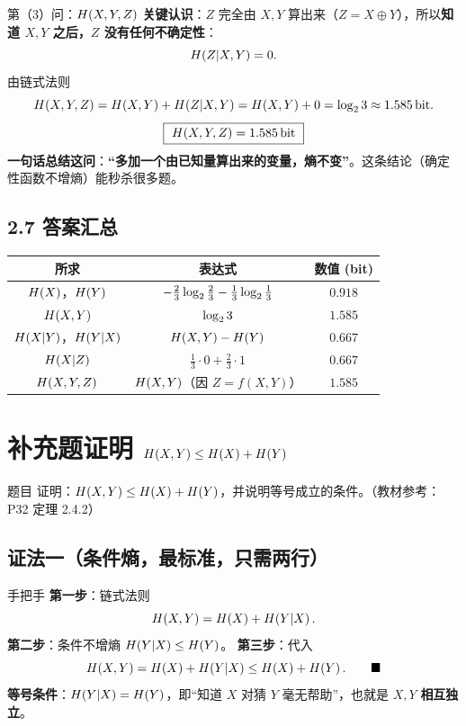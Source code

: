 \documentclass[11pt,a4paper]{ctexart}
\begin{document}
\begin{calc}{第（3）问：$H\!\left(X,Y,Z\right)$}
\textbf{关键认识}：$Z$ 完全由 $X,Y$ 算出来（$Z=X\oplus Y$），所以\textbf{知道 $X,Y$ 之后，$Z$ 没有任何不确定性}：
\[
H\!\left(Z|X,Y\right)=0 .
\]
由链式法则
\[
H\!\left(X,Y,Z\right)=H\!\left(X,Y\right)+H\!\left(Z|X,Y\right)=H\!\left(X,Y\right)+0=\log_{2}3\approx1.585\,\text{bit} .
\]
\[
\boxed{\ \Hx{X,Y,Z}=1.585\bit\ }
\]
\textbf{一句话总结这问}：\textbf{“多加一个由已知量算出来的变量，熵不变”}。这条结论（确定性函数不增熵）能秒杀很多题。
\end{calc}

\subsection{2.7 答案汇总}

\begin{center}
\renewcommand{\arraystretch}{1.35}
\begin{tabular}{c|c|c}
\toprule
所求 & 表达式 & 数值 (bit)\\
\midrule
$H\!\left(X\right)$，$H\!\left(Y\right)$ & $-\frac23\log_{2}\frac23-\frac13\log_{2}\frac13$ & $0.918$\\
$H\!\left(X,Y\right)$ & $\log_{2}3$ & $1.585$\\
$H\!\left(X|Y\right)$，$H\!\left(Y|X\right)$ & $H\!\left(X,Y\right)-H\!\left(Y\right)$ & $0.667$\\
$H\!\left(X|Z\right)$ & $\frac13\cdot0+\frac23\cdot1$ & $0.667$\\
$H\!\left(X,Y,Z\right)$ & $H\!\left(X,Y\right)$（因 $Z=f(X,Y)$） & $1.585$\\
\bottomrule
\end{tabular}
\end{center}

\section{补充题\quad 证明 $H\!\left(X,Y\right)\le H\!\left(X\right)+H\!\left(Y\right)$}

\begin{defbox}{题目}
证明：$H\!\left(X,Y\right)\le H\!\left(X\right)+H\!\left(Y\right)$，并说明等号成立的条件。（教材参考：P32 定理 2.4.2）
\end{defbox}

\subsection*{证法一（条件熵，最标准，只需两行）}
\begin{calc}{手把手}
\textbf{第一步}：链式法则
\[
H\!\left(X,Y\right)=H\!\left(X\right)+H\!\left(Y|X\right).
\]
\textbf{第二步}：条件不增熵 $H\!\left(Y|X\right)\le H\!\left(Y\right)$。
\textbf{第三步}：代入
\[
H\!\left(X,Y\right)=H\!\left(X\right)+H\!\left(Y|X\right)\le H\!\left(X\right)+H\!\left(Y\right).\qquad\blacksquare
\]
\textbf{等号条件}：$H\!\left(Y|X\right)=H\!\left(Y\right)$，即“知道 $X$ 对猜 $Y$ 毫无帮助”，也就是 $X,Y$ \textbf{相互独立}。
\end{calc}
\end{document}
